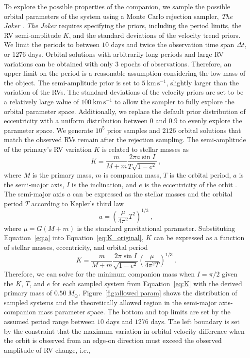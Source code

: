\documentclass[12pt]{ucsddissertation}
\begin{document}
\begin{CJK*}{UTF8}{gbsn}
To explore the possible properties of the companion, we sample the possible orbital parameters of the system using a Monte Carlo rejection sampler, \textit{The Joker} \citep{thejoker}. \textit{The Joker} requires specifying the priors, including the period limits, the RV semi-amplitude $K$, and the standard deviations of the velocity trend priors. We limit the periods to between $10$ days and twice the observation time span $\Delta t$, or $1276$ days. Orbital solutions with arbitrarily long periods and large RV variations can be obtained with only $3$ epochs of observations. Therefore, an upper limit on the period is a reasonable assumption considering the low mass of the object. The semi-amplitude prior is set to $5~\mathrm{km}\,\mathrm{s}^{-1}$, slightly larger than the variation of the RVs. The standard deviations of the velocity priors are set to be a relatively large value of $100~\mathrm{km}\,\mathrm{s}^{-1}$ to allow the sampler to fully explore the orbital parameter space. Additionally, we replace the default prior distribution of eccentricity with a uniform distribution between $0$ and $0.9$ to evenly explore the parameter space. We generate $10^5$ prior samples and $2126$ orbital solutions that match the observed RVs remain after the rejection sampling. The semi-amplitude of the primary's RV variation $K$ is related to stellar masses as
\begin{equation}
\label{eq:K_original}
    K=\frac{m}{M+m}\frac{2\pi a\sin I}{T\sqrt{1-e^2}}~,
\end{equation}
where $M$ is the primary mass, $m$ is companion mass, $T$ is the orbital period, $a$ is the semi-major axis, $I$ is the inclination, and $e$ is the eccentricity of the orbit \citep{Murray-2010}. The semi-major axis $a$ can be expressed as the stellar masses and the orbital period $T$ according to Kepler's third law
\begin{equation}
\label{eq:a}
    a=\left(\frac{\mu}{4\pi^2}T^2\right)^{1/3}~,
\end{equation}
where $\mu=G\left(M+m\right)$ is the standard gravitational parameter. Substituting Equation~\ref{eq:a} into Equation~\ref{eq:K_original}, $K$ can be expressed as a function of stellar masses, eccentricity, and orbital period
\begin{equation}
\label{eq:K}
    K=\frac{m}{M+m}\frac{2\pi\sin I}{\sqrt{1-e^2}}\left(\frac{\mu}{4\pi^2T}\right)^{1/3}~.
\end{equation}
Therefore, we can solve for the minimum companion mass when $I=\pi/2$ given the $K$, $T$, and $e$ for each sampled system from Equation~\ref{eq:K} with the derived primary mass of $0.50~M_\odot$. Figure~\ref{fig:allowed param} shows the distribution of sampled systems and the theoretically allowed region in the semi-major axis-companion mass parameter space. The bottom and top limits are set by the assumed period range between $10$ days and $1276$ days. The left boundary is set by the constraint that the maximum variation in orbital velocity difference when the orbit is observed from an edge-on direction must exceed the observed amplitude of RV change, i.e., 

\end{CJK*}
\end{document}

